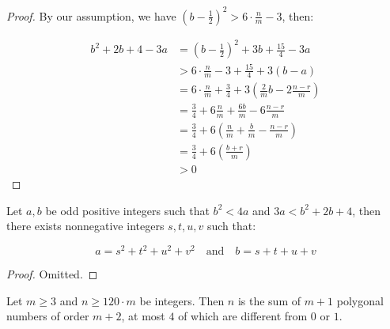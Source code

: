 \begin{proof}
    By our assumption, we have $(b-\frac{1}{2})^2>6\cdot \frac{n}{m} - 3$, then:

    \begin{align}
        b^2+2b+4-3a &= \left(b-\frac{1}{2}\right)^2 + 3b + \frac{15}{4} - 3a \\
        &> 6\cdot \frac{n}{m} - 3 + \frac{15}{4} + 3\left(b-a\right) \\
        &=6\cdot\frac{n}{m} + \frac{3}{4} + 3\left(\frac{2}{m}b - 2\frac{n-r}{m}\right) \\
        &=\frac{3}{4} + 6\frac{n}{m} + \frac{6b}{m}-6\frac{n-r}{m} \\
        &=\frac{3}{4} + 6\left(\frac{n}{m} + \frac{b}{m} - \frac{n-r}{m}\right) \\
        &=\frac{3}{4} + 6\left(\frac{b+r}{m}\right) \\
        &>0
    \end{align}
\end{proof}

\begin{lemma}
    \label{lem:CauchyLemma}
    \leanok

    Let $a,b$ be odd positive integers such that $b^2<4a$ and $3a<b^2+2b+4$, then there exists nonnegative integers $s,t,u,v$ such that:

    \[
        a=s^2+t^2+u^2+v^2 \quad \text{and} \quad b=s+t+u+v
    \]
\end{lemma}

\begin{proof}
    Omitted.
\end{proof}


%
%
\begin{theorem}
    \label{thm:thmone}
    Let $m\geq 3$ and $n\geq 120\cdot m$ be integers. Then $n$ is the sum of $m+1$ polygonal numbers of order $m+2$, at most $4$ of which are different from $0$ or $1$. 
    
\end{theorem}